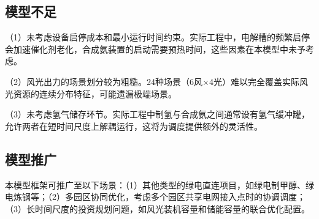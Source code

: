 \subsection{模型不足}

（1）未考虑设备启停成本和最小运行时间约束。实际工程中，电解槽的频繁启停会加速催化剂老化，合成氨装置的启动需要预热时间，这些因素在本模型中未予考虑。

（2）风光出力的场景划分较为粗糙。24种场景（6风$\times$4光）难以完全覆盖实际风光资源的连续分布特征，可能遗漏极端场景。

（3）未考虑氢气储存环节。实际工程中制氢与合成氨之间通常设有氢气缓冲罐，允许两者在短时间尺度上解耦运行，这将为调度提供额外的灵活性。

\subsection{模型推广}

本模型框架可推广至以下场景：（1）其他类型的绿电直连项目，如绿电制甲醇、绿电炼钢等；（2）多园区协同优化，考虑多个园区共享电网接入点时的协调调度；（3）长时间尺度的投资规划问题，如风光装机容量和储能容量的联合优化配置。
